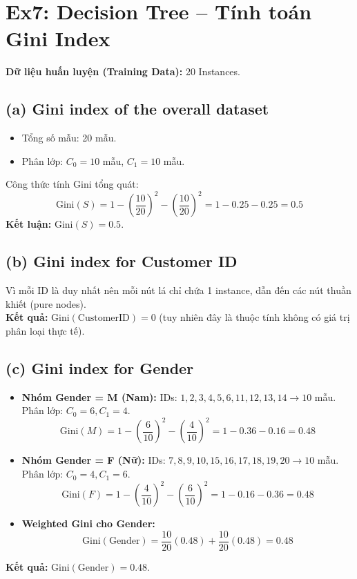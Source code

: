 \section{Ex7: Decision Tree -- Tính toán Gini Index}

\textbf{Dữ liệu huấn luyện (Training Data):} 20 Instances.

\subsection*{(a) Gini index of the overall dataset}
\begin{itemize}
    \item Tổng số mẫu: 20 mẫu.
    \item Phân lớp: $C_0 = 10$ mẫu, $C_1 = 10$ mẫu.
\end{itemize}
Công thức tính Gini tổng quát:
$$\text{Gini}(S) = 1 - \left(\frac{10}{20}\right)^2 - \left(\frac{10}{20}\right)^2 = 1 - 0.25 - 0.25 = 0.5$$
\textbf{Kết luận:} $\text{Gini}(S) = 0.5$.

\subsection*{(b) Gini index for Customer ID}
Vì mỗi ID là duy nhất nên mỗi nút lá chỉ chứa 1 instance, dẫn đến các nút thuần khiết (pure nodes). \\
\textbf{Kết quả:} $\text{Gini}(\text{CustomerID}) = 0$ (tuy nhiên đây là thuộc tính không có giá trị phân loại thực tế).

\subsection*{(c) Gini index for Gender}
\begin{itemize}
    \item \textbf{Nhóm Gender = M (Nam):} IDs: $1, 2, 3, 4, 5, 6, 11, 12, 13, 14 \rightarrow 10$ mẫu. Phân lớp: $C_0 = 6, C_1 = 4$.
    $$\text{Gini}(M) = 1 - \left(\frac{6}{10}\right)^2 - \left(\frac{4}{10}\right)^2 = 1 - 0.36 - 0.16 = 0.48$$
    \item \textbf{Nhóm Gender = F (Nữ):} IDs: $7, 8, 9, 10, 15, 16, 17, 18, 19, 20 \rightarrow 10$ mẫu. Phân lớp: $C_0 = 4, C_1 = 6$.
    $$\text{Gini}(F) = 1 - \left(\frac{4}{10}\right)^2 - \left(\frac{6}{10}\right)^2 = 1 - 0.16 - 0.36 = 0.48$$
    \item \textbf{Weighted Gini cho Gender:}
    $$\text{Gini}(\text{Gender}) = \frac{10}{20}(0.48) + \frac{10}{20}(0.48) = 0.48$$
\end{itemize}
\textbf{Kết quả:} $\text{Gini}(\text{Gender}) = 0.48$.

